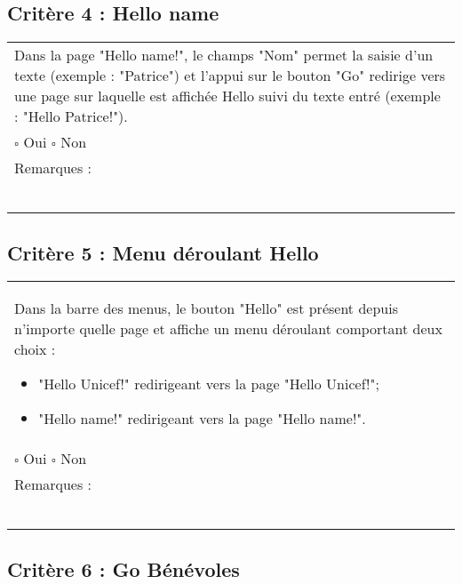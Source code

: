   		
  		
  	\subsection*{Critère 4 : Hello name}
	
	\begin{center}
    	 		\begin{tabular}[h]{|p{}|}
			\hline
				Dans la page "Hello name!", le champs "Nom" permet la saisie d'un texte (exemple : "Patrice") et l'appui sur le bouton "Go" redirige vers une page sur laquelle est affichée Hello suivi du texte entré (exemple : "Hello Patrice!").  \\
				$\square$ Oui  \hfill \hfill $\square$ Non \\\hline Remarques : \\ ~\\
			 \\\hline
     		\end{tabular}
  		\end{center}	
  		
  			
  	\subsection*{Critère 5 : Menu déroulant Hello}
	
	\begin{center}
    	 		\begin{tabular}[h]{|p{}|}
			\hline
				Dans la barre des menus, le bouton "Hello" est présent depuis n'importe quelle page et affiche un menu déroulant comportant deux choix : 
				\begin{itemize}
					\item "Hello Unicef!" redirigeant vers la page "Hello Unicef!";
					\item "Hello name!" redirigeant vers la page "Hello name!".
				\end{itemize}				 \\
				$\square$ Oui  \hfill \hfill $\square$ Non \\\hline Remarques : \\ ~\\
			 \\\hline
     		\end{tabular}
  		\end{center}	
  		
  		
  	\subsection*{Critère 6 : Go Bénévoles}
	
